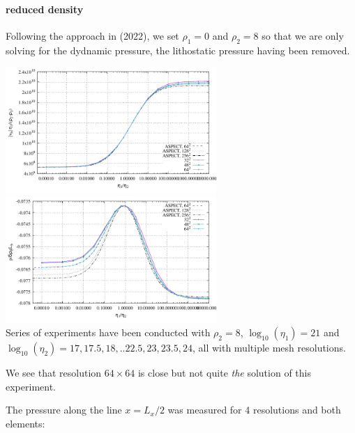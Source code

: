 \paragraph{reduced density}

Following the approach in \textcite{thba22} (2022), 
we set $\rho_1=0$ and $\rho_2=8$ so that we are only solving for the dydnamic 
pressure, the lithostatic pressure having been removed.

\begin{center}
\includegraphics[width=8cm]{python_codes/fieldstone_53/results/reduced/results_v.pdf}
\includegraphics[width=8cm]{python_codes/fieldstone_53/results/reduced/results_p.pdf}\\
{\captionfont
Series of experiments have been conducted with $\rho_2=8$, 
$\log_{10}(\eta_1)=21$ and $\log_{10}(\eta_2)=17,17.5,18,..22.5,23,23.5,24$, 
all with multiple mesh resolutions.}
 \end{center}

We see that resolution $64\times 64$ is close but not quite {\sl the} solution of this experiment.

The pressure along the line $x=L_x/2$ was measured for 4 resolutions and both elements:
 
